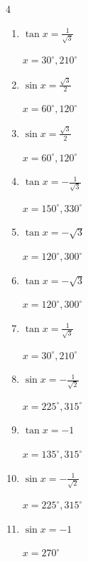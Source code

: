 \begin{multicols}{4}
\begin{enumerate}
        $\displaystyle x = 150^{\circ} , 330^{\circ}$

\columnbreak %

  \item $\displaystyle \tan{x}  = \frac{1}{\sqrt{3}}$

        $\displaystyle x = 30^{\circ} , 210^{\circ}$

  \item $\displaystyle \sin{x}  = \frac{\sqrt{3}}{2}$

        $\displaystyle x = 60^{\circ} , 120^{\circ}$

  \item $\displaystyle \sin{x}  = \frac{\sqrt{3}}{2}$

        $\displaystyle x = 60^{\circ} , 120^{\circ}$

  \item $\displaystyle \tan{x}  = -\frac{1}{\sqrt{3}}$

        $\displaystyle x = 150^{\circ} , 330^{\circ}$

  \item $\displaystyle \tan{x}  = -\sqrt{3}$

        $\displaystyle x = 120^{\circ} , 300^{\circ}$

  \item $\displaystyle \tan{x}  = -\sqrt{3}$

        $\displaystyle x = 120^{\circ} , 300^{\circ}$

  \item $\displaystyle \tan{x}  = \frac{1}{\sqrt{3}}$

        $\displaystyle x = 30^{\circ} , 210^{\circ}$

  \item $\displaystyle \sin{x}  = -\frac{1}{\sqrt{2}}$

        $\displaystyle x = 225^{\circ} , 315^{\circ}$

  \item $\displaystyle \tan{x}  = -1$

        $\displaystyle x = 135^{\circ} , 315^{\circ}$

  \item $\displaystyle \sin{x}  = -\frac{1}{\sqrt{2}}$

        $\displaystyle x = 225^{\circ} , 315^{\circ}$

  \item $\displaystyle \sin{x}  = -1$

        $\displaystyle x = 270^{\circ}$


\end{enumerate}
\end{multicols}

